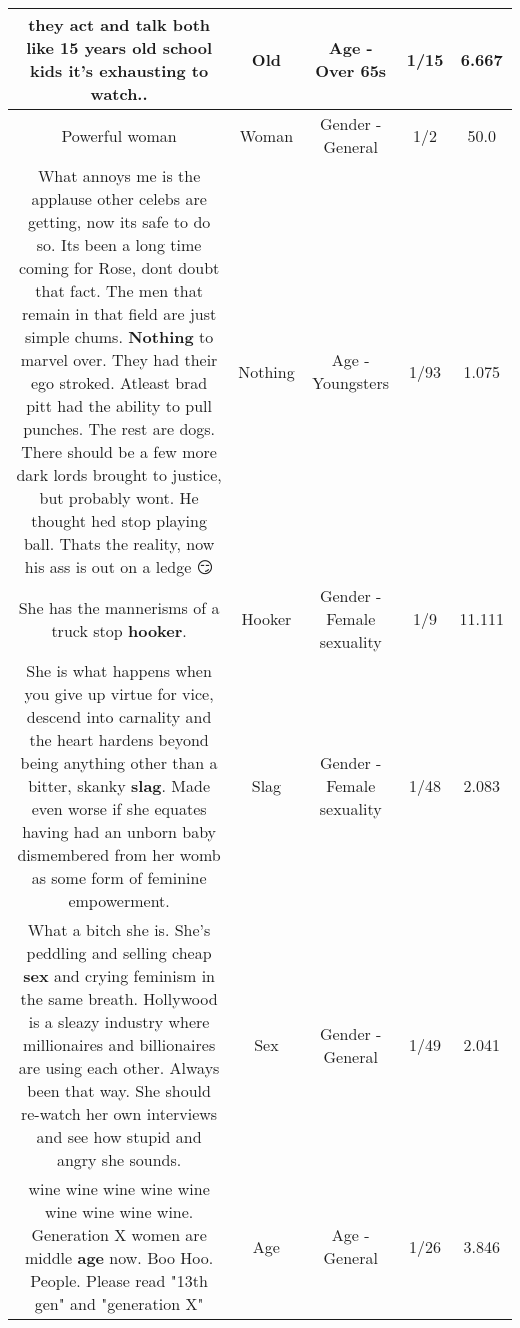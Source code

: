 \documentclass[11pt]{article}
\newlength\mylength
\begin{document}
\begin{center}
\begin{longtable}{|C{.65\mylength}|C{.30\mylength}|C{.12\mylength}|C{.12\mylength}|C{.12\mylength}|}
  \small they act and talk both like 15 years \textbf{old} school kids it's exhausting to watch..\normalsize   & Old & Age - Over 65s & 1/15 & 6.667 \\  \hline
  \small Powerful woman\normalsize   & Woman & Gender - General & 1/2 & 50.0 \\  \hline
  \small What annoys me is the applause other celebs are getting, now its safe to do so.  Its been a long time coming for Rose, dont doubt that fact. The men that remain in that field are just simple chums. \textbf{Nothing} to marvel over. They had their ego stroked.  Atleast brad pitt had the ability to pull punches. The rest are dogs. There should be a few more dark lords brought to justice, but probably wont. He thought hed stop playing ball. Thats the reality, now his ass is out on a ledge 😏\normalsize   & Nothing & Age - Youngsters & 1/93 & 1.075 \\  \hline
  \small She has the mannerisms of a truck stop \textbf{hooker}.\normalsize   & Hooker & Gender - Female sexuality & 1/9 & 11.111 \\  \hline
  \small She is what happens when you give up virtue for vice, descend into carnality and the heart hardens beyond being anything other than a bitter, skanky \textbf{slag}.  Made even worse if she equates having had an unborn baby dismembered from her womb as some form of feminine empowerment.\normalsize   & Slag & Gender - Female sexuality & 1/48 & 2.083 \\  \hline
  \small What a bitch she is. She's peddling and selling cheap \textbf{sex} and crying feminism in the same breath.   Hollywood is a sleazy industry where millionaires and billionaires are using each other.  Always been that way. She should re-watch her own interviews and see how stupid and angry she sounds.\normalsize   & Sex & Gender - General & 1/49 & 2.041 \\  \hline
  \small wine wine wine wine wine wine wine wine wine.  Generation X women are middle \textbf{age} now. Boo Hoo. People. Please read "13th gen" and "generation X"\normalsize   & Age & Age - General & 1/26 & 3.846 \\  \hline

\end{longtable}
\end{center}
\end{document}
